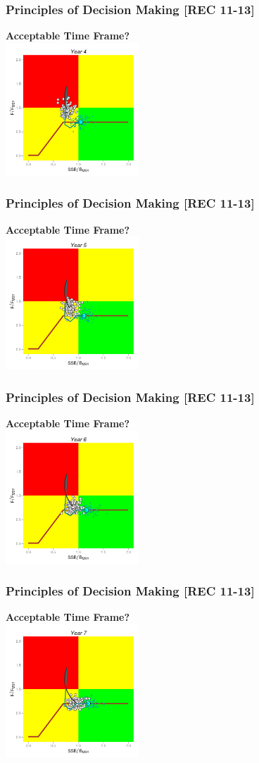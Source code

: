 \begin{frame}\frametitle{Principles of Decision Making [REC 11-13]} \smallskip\textbf{Acceptable Time Frame?}\smallskip\\ \includegraphics[height=50mm,width=50mm]{hcrII5.png}\end{frame}
\begin{frame}\frametitle{Principles of Decision Making [REC 11-13]} \smallskip\textbf{Acceptable Time Frame?}\smallskip\\ \includegraphics[height=50mm,width=50mm]{hcrII6.png}\end{frame}
\begin{frame}\frametitle{Principles of Decision Making [REC 11-13]} \smallskip\textbf{Acceptable Time Frame?}\smallskip\\ \includegraphics[height=50mm,width=50mm]{hcrII7.png}\end{frame}
\begin{frame}\frametitle{Principles of Decision Making [REC 11-13]} \smallskip\textbf{Acceptable Time Frame?}\smallskip\\ \includegraphics[height=50mm,width=50mm]{hcrII8.png}\end{frame}
